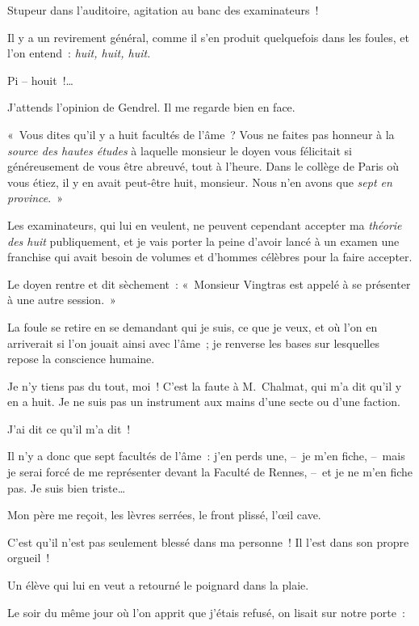\documentclass[french,twoside]{book} %
\newcommand{\astertri}{\medskip\par\centerline{\color{rubric}\large\selectfont{\syms ✻\,✻\,✻}}\medskip\par}%
\begin{document}
\astertri

\noindent Stupeur dans l’auditoire, agitation au banc des examinateurs !\par
Il y a un revirement général, comme il s’en produit quelquefois dans les foules, et l’on entend : \emph{huit, huit, huit.}\par
Pi – houit !…\par
\bigbreak
\noindent J’attends l’opinion de Gendrel. Il me regarde bien en face.\par
« Vous dites qu’il y a huit facultés de l’âme ? Vous ne faites pas honneur à la \emph{source des hautes études} à laquelle monsieur le doyen vous félicitait si généreusement de vous être abreuvé, tout à l’heure. Dans le collège de Paris où vous étiez, il y en avait peut-être huit, monsieur. Nous n’en avons que \emph{sept en province}. »\par
Les examinateurs, qui lui en veulent, ne peuvent cependant accepter ma \emph{théorie des huit} publiquement, et je vais porter la peine d’avoir lancé à un examen une franchise qui avait besoin de volumes et d’hommes célèbres pour la faire accepter.\par
Le doyen rentre et dit sèchement : « Monsieur Vingtras est appelé à se présenter à une autre session. »\par
La foule se retire en se demandant qui je suis, ce que je veux, et où l’on en arriverait si l’on jouait ainsi avec l’âme ; je renverse les bases sur lesquelles repose la conscience humaine.\par
Je n’y tiens pas du tout, moi ! C’est la faute à M. Chalmat, qui m’a dit qu’il y en a huit. Je ne suis pas un instrument aux mains d’une secte ou d’une faction.\par
J’ai dit ce qu’il m’a dit !\par
Il n’y a donc que sept facultés de l’âme : j’en perds une, – je m’en fiche, – mais je serai forcé de me représenter devant la Faculté de Rennes, – et je ne m’en fiche pas. Je suis bien triste…\par
\bigbreak
\noindent Mon père me reçoit, les lèvres serrées, le front plissé, l’œil cave.\par
C’est qu’il n’est pas seulement blessé dans ma personne ! Il l’est dans son propre orgueil !\par
Un élève qui lui en veut a retourné le poignard dans la plaie.\par
Le soir du même jour où l’on apprit que j’étais refusé, on lisait sur notre porte :\par
\end{document}
